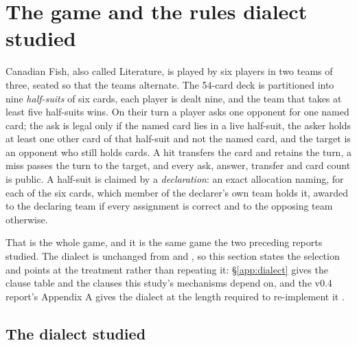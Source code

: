 \section{The game and the rules dialect studied}
\label{sec:rules}

Canadian Fish, also called Literature, is played by six players in two teams of
three, seated so that the teams alternate. The 54-card deck is partitioned into
nine \emph{half-suits} of six cards, each player is dealt nine, and the team
that takes at least five half-suits wins. On their turn a player asks one
opponent for one named card; the ask is legal only if the named card lies in a
live half-suit, the asker holds at least one other card of that half-suit and
not the named card, and the target is an opponent who still holds cards. A hit
transfers the card and retains the turn, a miss passes the turn to the target,
and every ask, answer, transfer and card count is public. A half-suit is claimed
by a \emph{declaration}: an exact allocation naming, for each of the six cards,
which member of the declarer's own team holds it, awarded to the declaring team
if every assignment is correct and to the opposing team otherwise.

That is the whole game, and it is the same game the two preceding reports
studied. The dialect is unchanged from \vfour{} and \vfive{}, so this section
states the selection and points at the treatment rather than repeating it:
\S\ref{app:dialect} gives the clause table and the clauses this study's
mechanisms depend on, and the v0.4 report's Appendix A gives the dialect at the
length required to re-implement it \cite{fishbot04}.

\subsection{The dialect studied}
\label{sec:rules-dialect}

